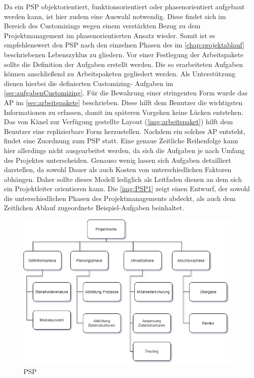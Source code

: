 	Da ein \acs{PSP} objektorientiert, funktionsorientiert oder phasenorientiert aufgebaut werden kann, ist hier zudem eine Auswahl notwendig. Diese findet sich im Bereich des Customizings wegen einem verstärkten Bezug zu dem Projektmanagement im phasenorientierten Ansatz wieder. 
	Somit ist es empfehlenswert den \acs{PSP} nach den einzelnen Phasen des im \autoref{chap:projektablauf} beschriebenen Lebenszyklus zu gliedern. Vor einer Festlegung der Arbeitspakete sollte die Definition der Aufgaben erstellt werden. Die so erarbeiteten Aufgaben können anschließend zu Arbeitspaketen gegliedert werden. 
	Als Unterstützung dienen hierbei die definierten Customizing- Aufgaben im \autoref{sec:aufgabenCustomizing}. Für die Bewahrung einer stringenten Form wurde das \acs{AP} im \autoref{sec:arbeitspakete} beschrieben. Diese hilft dem Benutzer die wichtigsten Informationen zu erfassen, damit im späteren Vorgehen keine Lücken entstehen. Das von Känel zur Verfügung gestellte Layout (\autoref{img:arbeitspaket}) hilft dem Benutzer eine replizierbare Form herzustellen. Nachdem ein solches \acs{AP} entsteht, findet eine Zuordnung zum \acs{PSP} statt. Eine genaue Zeitliche Reihenfolge kann hier allerdings nicht ausgearbeitet werden, da sich die Aufgaben je nach Umfang des Projektes unterscheiden. Genauso wenig lassen sich Aufgaben detailliert darstellen, da sowohl Dauer als auch Kosten von unterschiedlichen Faktoren abhängen. Daher sollte dieses Modell lediglich als Leitfaden dienen an dem sich ein Projektleiter orientieren kann. Die \autoref{img:PSP1} zeigt einen Entwurf, der sowohl die unterschiedlichen Phasen des Projektmanagements abdeckt, als auch dem Zeitlichen Ablauf zugeordnete Beispiel-Aufgaben beinhaltet.   
	
	\begin{figure}[h]
		\centering
		\includegraphics[width=15cm]{img/psp01.png}
		\caption{\ac{PSP}}
		\label{img:PSP1}
	\end{figure}
	
	
	
	
	
